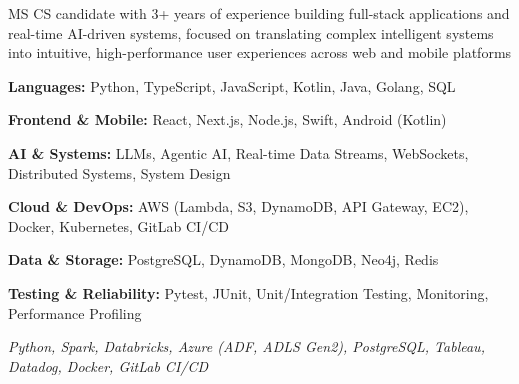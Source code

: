 MS CS candidate with 3+ years of experience building full-stack applications and real-time AI-driven systems, focused on translating complex intelligent systems into intuitive, high-performance user experiences across web and mobile platforms

\textbf{Languages:} Python, TypeScript, JavaScript, Kotlin, Java, Golang, SQL

\textbf{Frontend \& Mobile:} React, Next.js, Node.js, Swift, Android (Kotlin)

\textbf{AI \& Systems:} LLMs, Agentic AI, Real-time Data Streams, WebSockets, Distributed Systems, System Design

\textbf{Cloud \& DevOps:} AWS (Lambda, S3, DynamoDB, API Gateway, EC2), Docker, Kubernetes, GitLab CI/CD

\textbf{Data \& Storage:} PostgreSQL, DynamoDB, MongoDB, Neo4j, Redis

\textbf{Testing \& Reliability:} Pytest, JUnit, Unit/Integration Testing, Monitoring, Performance Profiling

\textit{Python, Spark, Databricks, Azure (ADF, ADLS Gen2), PostgreSQL, Tableau, Datadog, Docker, GitLab CI/CD}

